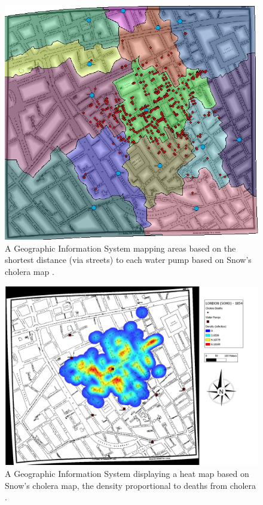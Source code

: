 \documentclass[12pt]{article}
\begin{document}
\begin{figure}
\centering
\includegraphics[scale=1.0]{gis_2}
\caption{
A Geographic Information System mapping areas based on the shortest distance (via streets) to each water pump based on Snow's cholera map \cite{udel2}.
}
\label{fig:gis2}
\end{figure}

\begin{figure}
\centering
\hspace*{-3cm}
\includegraphics[scale=0.3]{gis_heatmap}
\caption{ 
A Geographic Information System displaying a heat map based on Snow's cholera map, the density proportional to deaths from cholera \cite{heatmap}.}
\label{fig:heatmap}
\end{figure}
\end{document}
